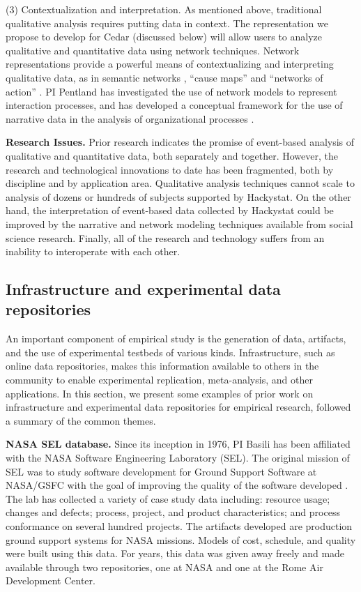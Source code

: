(3) Contextualization and interpretation.  As mentioned above, traditional
qualitative analysis requires putting data in context.  The representation
we propose to develop for Cedar (discussed below) will allow users to
analyze qualitative and quantitative data using network techniques.
Network representations provide a powerful means of contextualizing and
interpreting qualitative data, as in semantic networks
\cite{Sowa84,Carley97}, ``cause maps'' \cite{Nelson91,Bougon77} and
``networks of action'' \cite{Czarniawska97,Pentland99a,Abell87}.  PI
Pentland has investigated the use of network models to represent
interaction processes, and has developed a conceptual framework for the use
of narrative data in the analysis of organizational processes
\cite{Pentland03a,Pentland99a}.

{\bf Research Issues.} Prior research indicates the promise of event-based
analysis of qualitative and quantitative data, both separately and
together.  However, the research and technological innovations to date has
been fragmented, both by discipline and by application area.  Qualitative
analysis techniques cannot scale to analysis of dozens or hundreds of
subjects supported by Hackystat.  On the other hand, the interpretation of
event-based data collected by Hackystat could be improved by the narrative
and network modeling techniques available from social science research.
Finally, all of the research and technology suffers from an inability to
interoperate with each other.


\subsection{Infrastructure and experimental data repositories}
\label{sec:repositories}

An important component of empirical study is the generation of data,
artifacts, and the use of experimental testbeds of various
kinds. Infrastructure, such as online data repositories, makes this
information available to others in the community to enable experimental
replication, meta-analysis, and other applications.  In this section, we
present some examples of prior work on infrastructure and experimental data
repositories for empirical research, followed a summary of the common themes. 

{\bf NASA SEL database.} Since its inception in 1976, PI Basili has been
affiliated with the NASA Software Engineering Laboratory (SEL).  The
original mission of SEL was to study software development for Ground
Support Software at NASA/GSFC with the goal of improving the quality of the
software developed \cite{Basili95}. The lab has collected a variety of case
study data including: resource usage; changes and defects; process,
project, and product characteristics; and process conformance on several
hundred projects.  The artifacts developed are production ground support
systems for NASA missions.  Models of cost, schedule, and quality were
built using this data.  For years, this data was given away freely and made
available through two repositories, one at NASA and one at the Rome Air
Development Center.

